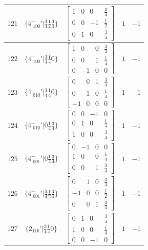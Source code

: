 \documentclass[fleqn,8pt]{jsarticle}
\begin{document}
\begin{longtable}{ccccc}
$ 121 $ & $ \{4^{+}_{\,\,100}{}'|\frac{3}{4} \frac{1}{2} \frac{3}{4}\} $ & $ \begin{bmatrix} 1 & 0 & 0 & \frac{3}{4} \\ 0 & 0 & -1 & \frac{1}{2} \\ 0 & 1 & 0 & \frac{3}{4} \end{bmatrix} $ & $ 1 $ & $ -1 $ \\ \hline
$ 122 $ & $ \{4^{-}_{\,\,100}{}'|\frac{3}{4} \frac{1}{4} 0\} $ & $ \begin{bmatrix} 1 & 0 & 0 & \frac{3}{4} \\ 0 & 0 & 1 & \frac{1}{4} \\ 0 & -1 & 0 & 0 \end{bmatrix} $ & $ 1 $ & $ -1 $ \\ \hline
$ 123 $ & $ \{4^{+}_{\,\,010}{}'|\frac{3}{4} \frac{1}{4} 0\} $ & $ \begin{bmatrix} 0 & 0 & 1 & \frac{3}{4} \\ 0 & 1 & 0 & \frac{1}{4} \\ -1 & 0 & 0 & 0 \end{bmatrix} $ & $ 1 $ & $ -1 $ \\ \hline
$ 124 $ & $ \{4^{-}_{\,\,010}{}'|0 \frac{1}{4} \frac{3}{4}\} $ & $ \begin{bmatrix} 0 & 0 & -1 & 0 \\ 0 & 1 & 0 & \frac{1}{4} \\ 1 & 0 & 0 & \frac{3}{4} \end{bmatrix} $ & $ 1 $ & $ -1 $ \\ \hline
$ 125 $ & $ \{4^{+}_{\,\,001}{}'|0 \frac{1}{4} \frac{3}{4}\} $ & $ \begin{bmatrix} 0 & -1 & 0 & 0 \\ 1 & 0 & 0 & \frac{1}{4} \\ 0 & 0 & 1 & \frac{3}{4} \end{bmatrix} $ & $ 1 $ & $ -1 $ \\ \hline
$ 126 $ & $ \{4^{-}_{\,\,001}{}'|\frac{3}{4} \frac{1}{2} \frac{3}{4}\} $ & $ \begin{bmatrix} 0 & 1 & 0 & \frac{3}{4} \\ -1 & 0 & 0 & \frac{1}{2} \\ 0 & 0 & 1 & \frac{3}{4} \end{bmatrix} $ & $ 1 $ & $ -1 $ \\ \hline
$ 127 $ & $ \{2{}_{110}{}'|\frac{3}{4} \frac{1}{4} 0\} $ & $ \begin{bmatrix} 0 & 1 & 0 & \frac{3}{4} \\ 1 & 0 & 0 & \frac{1}{4} \\ 0 & 0 & -1 & 0 \end{bmatrix} $ & $ 1 $ & $ -1 $ \\ \hline

\end{longtable}
\end{document}
